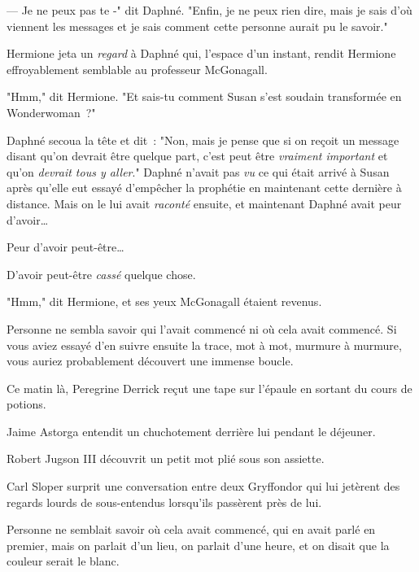 --- Je ne peux pas te -" dit Daphné. "Enfin, je ne peux rien dire, mais je sais d'où viennent les messages et je sais comment cette personne aurait pu le savoir."

Hermione jeta un \emph{regard} à Daphné qui, l'espace d'un instant, rendit Hermione effroyablement semblable au professeur McGonagall.

"Hmm," dit Hermione. "Et sais-tu comment Susan s'est soudain transformée en Wonderwoman~?"

Daphné secoua la tête et dit~: "Non, mais je pense que si on reçoit un message disant qu'on devrait être quelque part, c'est peut être \emph{vraiment important} et qu'on \emph{devrait tous y aller}." Daphné n'avait pas \emph{vu} ce qui était arrivé à Susan après qu'elle eut essayé d'empêcher la prophétie en maintenant cette dernière à distance. Mais on le lui avait \emph{raconté} ensuite, et maintenant Daphné avait peur d'avoir…

Peur d'avoir peut-être…

D'avoir peut-être \emph{cassé} quelque chose.

"Hmm," dit Hermione, et ses yeux McGonagall étaient revenus.

\later

Personne ne sembla savoir qui l'avait commencé ni où cela avait commencé. Si vous aviez essayé d'en suivre ensuite la trace, mot à mot, murmure à murmure, vous auriez probablement découvert une immense boucle.

Ce matin là, Peregrine Derrick reçut une tape sur l'épaule en sortant du cours de potions.

Jaime Astorga entendit un chuchotement derrière lui pendant le déjeuner.

Robert Jugson III découvrit un petit mot plié sous son assiette.

Carl Sloper surprit une conversation entre deux Gryffondor qui lui jetèrent des regards lourds de sous-entendus lorsqu'ils passèrent près de lui.

Personne ne semblait savoir où cela avait commencé, qui en avait parlé en premier, mais on parlait d'un lieu, on parlait d'une heure, et on disait que la couleur serait le blanc.

\later

